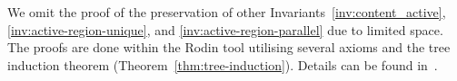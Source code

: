 


 


We omit the proof of the preservation of other Invariants~\ref{inv:content_active}, \ref{inv:active-region-unique}, and \ref{inv:active-region-parallel} due to limited space. 
The proofs are done within the Rodin tool utilising several axioms and the tree induction theorem (Theorem~\ref{thm:tree-induction}). 
Details can be found in~\cite{Hoang2023:SCXMLSemanticsModel}.

